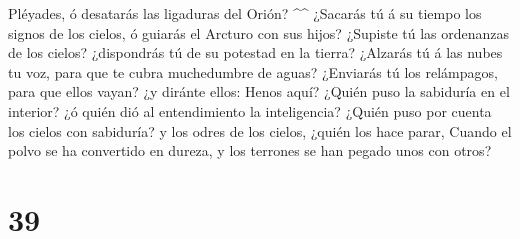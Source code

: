 Pléyades, ó desatarás las ligaduras del Orión? \^{}\^{} 
¿Sacarás tú á su tiempo los signos de los cielos, ó guiarás el Arcturo
con sus hijos?  ¿Supiste tú las ordenanzas de los cielos?
¿dispondrás tú de su potestad en la tierra?  ¿Alzarás tú á
las nubes tu voz, para que te cubra muchedumbre de aguas? 
¿Enviarás tú los relámpagos, para que ellos vayan? ¿y diránte ellos:
Henos aquí?  ¿Quién puso la sabiduría en el interior? ¿ó
quién dió al entendimiento la inteligencia?  ¿Quién puso
por cuenta los cielos con sabiduría? y los odres de los cielos, ¿quién
los hace parar,  Cuando el polvo se ha convertido en
dureza, y los terrones se han pegado unos con otros? 

\hypertarget{section-38}{%
\section{39}\label{section-38}}

